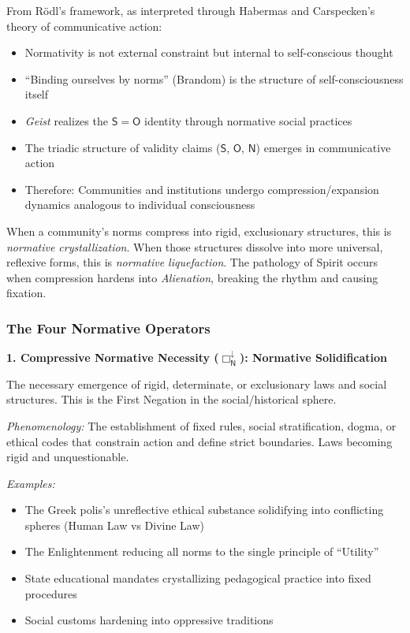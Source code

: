 \documentclass[12pt]{book}
\newcommand{\NBoxDown}{\Box_{\mathsf{N}}^{\downarrow}}
\begin{document}
From Rödl's framework, as interpreted through Habermas and Carspecken's theory of communicative action:
\begin{itemize}
\item Normativity is not external constraint but internal to self-conscious thought
\item ``Binding ourselves by norms'' (Brandom) is the structure of self-consciousness itself
\item \textit{Geist} realizes the $\mathsf{S} = \mathsf{O}$ identity through normative social practices
\item The triadic structure of validity claims ($\mathsf{S}$, $\mathsf{O}$, $\mathsf{N}$) emerges in communicative action
\item Therefore: Communities and institutions undergo compression/expansion dynamics analogous to individual consciousness
\end{itemize}

When a community's norms compress into rigid, exclusionary structures, this is \textit{normative crystallization}. When those structures dissolve into more universal, reflexive forms, this is \textit{normative liquefaction}. The pathology of Spirit occurs when compression hardens into \textit{Alienation}, breaking the rhythm and causing fixation.

\subsubsection{The Four Normative Operators}

\bigskip

\noindent\textbf{1. Compressive Normative Necessity ($\NBoxDown$): Normative Solidification}

The necessary emergence of rigid, determinate, or exclusionary laws and social structures. This is the First Negation in the social/historical sphere.

\textit{Phenomenology:} The establishment of fixed rules, social stratification, dogma, or ethical codes that constrain action and define strict boundaries. Laws becoming rigid and unquestionable.

\textit{Examples:}
\begin{itemize}
\item The Greek polis's unreflective ethical substance solidifying into conflicting spheres (Human Law vs Divine Law)
\item The Enlightenment reducing all norms to the single principle of ``Utility''
\item State educational mandates crystallizing pedagogical practice into fixed procedures
\item Social customs hardening into oppressive traditions
\end{itemize}
\end{document}
